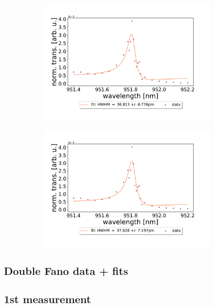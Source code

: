 \begin{figure}[h!]
\begin{subfigure}[b]{0.49\textwidth}
        \includegraphics[width=\textwidth]{figures/results/single fano fits/5um_M5_fit_3.pdf}
        \caption{}
        \label{fig:5um_M5_fit_3}
    \end{subfigure}
    \begin{subfigure}[b]{0.49\textwidth}
        \includegraphics[width=\textwidth]{figures/results/single fano fits/5um_M5_fit_4.pdf}
        \caption{}
        \label{fig:5um_M5_fit_4}
    \end{subfigure}
\end{figure}

\clearpage
\subsection{Double Fano data + fits}

\subsection*{1st measurement}

